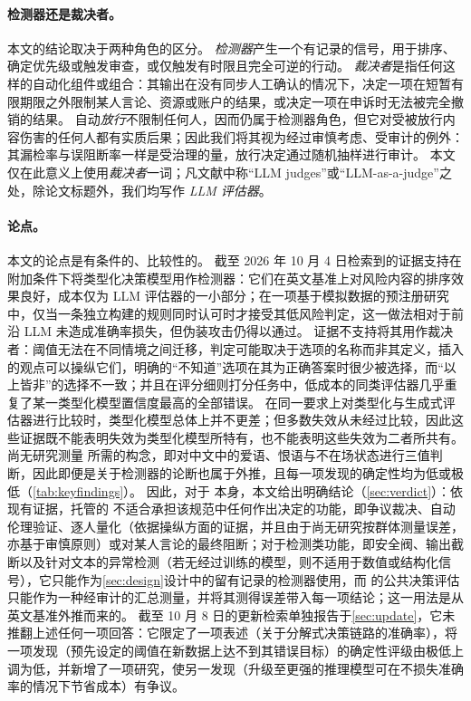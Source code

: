 \paragraph{检测器还是裁决者。}
本文的结论取决于两种角色的区分。
\emph{检测器}产生一个有记录的信号，用于排序、确定优先级或触发审查，或仅触发有时限且完全可逆的行动。
\emph{裁决者}是指任何这样的自动化组件或组合：其输出在没有同步人工确认的情况下，决定一项在短暂有限期限之外限制某人言论、资源或账户的结果，或决定一项在申诉时无法被完全撤销的结果。
自动\emph{放行}不限制任何人，因而仍属于检测器角色，但它对受被放行内容伤害的任何人都有实质后果；因此我们将其视为经过审慎考虑、受审计的例外：其漏检率与误阻断率一样是受治理的量，放行决定通过随机抽样进行审计。
本文仅在此意义上使用\emph{裁决者}一词；凡文献中称“LLM judges”或“LLM-as-a-judge”之处，除论文标题外，我们均写作 \emph{LLM 评估器}。

\paragraph{论点。}
本文的论点是有条件的、比较性的。
截至 2026 年 10 月 4 日检索到的证据支持在附加条件下将类型化决策模型用作检测器：它们在英文基准上对风险内容的排序效果良好，成本仅为 LLM 评估器的一小部分；在一项基于模拟数据的预注册研究中，仅当一条独立构建的规则同时认可时才接受其低风险判定，这一做法相对于前沿 LLM 未造成准确率损失，但伪装攻击仍得以通过。
证据不支持将其用作裁决者：阈值无法在不同情境之间迁移，判定可能取决于选项的名称而非其定义，插入的观点可以操纵它们，明确的“不知道”选项在其为正确答案时很少被选择，而“以上皆非”的选择不一致；并且在评分细则打分任务中，低成本的同类评估器几乎重复了某一类型化模型置信度最高的全部错误。
在同一要求上对类型化与生成式评估器进行比较时，类型化模型总体上并不更差；但多数失效从未经过比较，因此这些证据既不能表明失效为类型化模型所特有，也不能表明这些失效为二者所共有。
尚无研究测量 \pol{} 所需的构念，即对中文中的爱语、恨语与不在场状态进行三值判断，因此即便是关于检测器的论断也属于外推，且每一项发现的确定性均为低或极低（\cref{tab:keyfindings}）。
因此，对于 \pol{} 本身，本文给出明确结论（\cref{sec:verdict}）：依现有证据，托管的 \jev{} 不适合承担该规范中任何作出决定的功能，即争议裁决、自动伦理验证、逐人量化（依据操纵方面的证据，并且由于尚无研究按群体测量误差，亦基于审慎原则）或对某人言论的最终阻断；对于检测类功能，即安全阀、输出截断以及针对文本的异常检测（若无经过训练的模型，则不适用于数值或结构化信号），它只能作为\cref{sec:design}设计中的留有记录的检测器使用，而  的公共决策评估只能作为一种经审计的汇总测量，并将其测得误差带入每一项结论；这一用法是从英文基准外推而来的。
截至 10 月 8 日的更新检索单独报告于\cref{sec:update}，它未推翻上述任何一项回答：它限定了一项表述（关于分解式决策链路的准确率），将一项发现（预先设定的阈值在新数据上达不到其错误目标）的确定性评级由极低上调为低，并新增了一项研究，使另一发现（升级至更强的推理模型可在不损失准确率的情况下节省成本）有争议。

